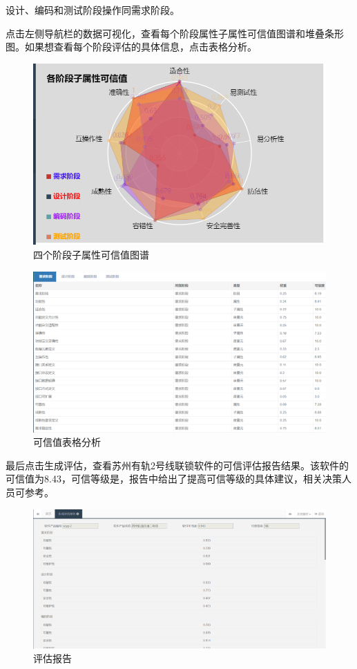 设计、编码和测试阶段操作同需求阶段。

点击左侧导航栏的数据可视化，查看每个阶段属性子属性可信值图谱和堆叠条形图。如果想查看每个阶段评估的具体信息，点击表格分析。
\begin{figure}[htb]
	\centering
	\includegraphics[width=13cm]{fig/sy5_20.png}
	\caption{四个阶段子属性可信值图谱}
	\label{fig:5_20}
\end{figure}

\begin{figure}[htb]
	\centering
	\includegraphics[width=13cm]{fig/sy5_19_4.png}
	\caption{可信值表格分析}
	\label{fig:5_21}
\end{figure}

最后点击生成评估，查看苏州有轨2号线联锁软件的可信评估报告结果。该软件的可信值为8.43，可信等级是\uppercase\expandafter{}，报告中给出了提高可信等级的具体建议，相关决策人员可参考。
\begin{figure}[htb]
	\centering
	\includegraphics[width=13cm]{fig/sy5_22.png}
	\caption{评估报告}
	\label{fig:5_22}
\end{figure}


